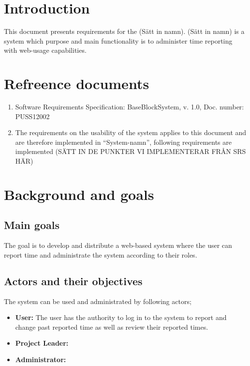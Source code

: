 \documentclass{article}
\date {#1}
\title {
    \documentNumber {01}    
    
    \documentVersion {0.1}
    
    \documentTitle {Template}
    \documentGroup {2}
    
    \documentResponsible {Project management Group}
    \documentAuthors {Project management group}
    
    \documentDate {2021-01-25}
}
\begin{document}
\maketitle
\thispagestyle{empty}

\newpage

\tableofcontents

\newpage



\section{Introduction}

This document presents requirements for the (Sätt in namn). (Sätt in namn) is a system which purpose and main functionality is to administer time reporting with web-usage capabilities. 


\section{Refreence documents}

\begin{enumerate}
  \item Software Requirements Specification: BaseBlockSystem, v. 1.0, Doc. number: PUSS12002
  \item The requirements on the usability of the system applies to this document and are therefore implemented in “System-namn”, following requirements are implemented (SÄTT IN DE PUNKTER VI IMPLEMENTERAR FRÅN SRS HÄR)
\end{enumerate}

\section{Background and goals}
\subsection{Main goals}

The goal is to develop and distribute a web-based system where the user can report time and administrate the system according to their roles.

\subsection{Actors and their objectives}
The system can be used and administrated by following actors;

\begin{itemize}
  \item \textbf{User:} The user has the authority to log in to the system to report and  change past reported time as well as review their reported times.
  \item \textbf{Project Leader:}
   \item \textbf{Administrator:}
\end{itemize}
\end{document}

